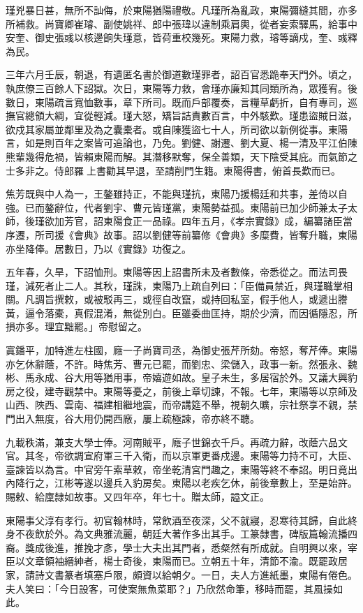 \begin{pinyinscope}
瑾兇暴日甚，無所不訕侮，於東陽猶陽禮敬。凡瑾所為亂政，東陽彌縫其間，亦多所補救。尚寶卿崔璿、副使姚祥、郎中張瑋以違制乘肩輿，從者妄索驛馬，給事中安奎、御史張彧以核邊餉失瑾意，皆荷重校幾死。東陽力救，璿等謫戍，奎、彧釋為民。

三年六月壬辰，朝退，有遺匿名書於御道數瑾罪者，詔百官悉跪奉天門外。頃之，執庶僚三百餘人下詔獄。次日，東陽等力救，會瑾亦廉知其同類所為，眾獲宥。後數日，東陽疏言寬恤數事，章下所司。既而戶部覆奏，言糧草虧折，自有專司，巡撫官總領大綱，宜從輕減。瑾大怒，矯旨詰責數百言，中外駭歎。瑾患盜賊日滋，欲戍其家屬並鄰里及為之囊橐者。或自陳獲盜七十人，所司欲以新例從事。東陽言，如是則百年之案皆可追論也，乃免。劉健、謝遷、劉大夏、楊一清及平江伯陳熊輩幾得危禍，皆賴東陽而解。其潛移默奪，保全善類，天下陰受其庇。而氣節之士多非之。侍郎羅上書勸其早退，至請削門生籍。東陽得書，俯首長歎而已。

焦芳既與中人為一，王鏊雖持正，不能與瑾抗，東陽乃援楊廷和共事，差倚以自強。已而鏊辭位，代者劉宇、曹元皆瑾黨，東陽勢益孤。東陽前已加少師兼太子太師，後瑾欲加芳官，詔東陽食正一品祿。四年五月，《孝宗實錄》成，編纂諸臣當序遷，所司援《會典》故事。詔以劉健等前纂修《會典》多糜費，皆奪升職，東陽亦坐降俸。居數日，乃以《實錄》功復之。

五年春，久旱，下詔恤刑。東陽等因上詔書所未及者數條，帝悉從之。而法司畏瑾，減死者止二人。其秋，瑾誅，東陽乃上疏自列曰：「臣備員禁近，與瑾職掌相關。凡調旨撰敕，或被駁再三，或徑自改竄，或持回私室，假手他人，或遞出謄黃，逼令落橐，真假混淆，無從別白。臣雖委曲匡持，期於少濟，而因循隱忍，所損亦多。理宜黜罷。」帝慰留之。

寘鐇平，加特進左柱國，廕一子尚寶司丞，為御史張芹所劾。帝怒，奪芹俸。東陽亦乞休辭蔭，不許。時焦芳、曹元已罷，而劉忠、梁儲入，政事一新。然張永、魏彬、馬永成、谷大用等猶用事，帝嬉遊如故。皇子未生，多居宿於外。又議大興豹房之役，建寺觀禁中。東陽等憂之，前後上章切諫，不報。七年，東陽等以京師及山西、陜西、雲南、福建相繼地震，而帝講筵不舉，視朝久曠，宗社祭享不親，禁門出入無度，谷大用仍開西廠，屢上疏極諫，帝亦終不聽。

九載秩滿，兼支大學士俸。河南賊平，廕子世錦衣千戶。再疏力辭，改蔭六品文官。其冬，帝欲調宣府軍三千入衛，而以京軍更番戍邊。東陽等力持不可，大臣、臺諫皆以為言。中官旁午索草敕，帝坐乾清宮門趣之，東陽等終不奉詔。明日竟出內降行之，江彬等遂以邊兵入豹房矣。東陽以老疾乞休，前後章數上，至是始許。賜敕、給廩隸如故事。又四年卒，年七十。贈太師，謚文正。

東陽事父淳有孝行。初官翰林時，常飲酒至夜深，父不就寢，忍寒待其歸，自此終身不夜飲於外。為文典雅流麗，朝廷大著作多出其手。工篆隸書，碑版篇翰流播四裔。獎成後進，推挽才彥，學士大夫出其門者，悉粲然有所成就。自明興以來，宰臣以文章領袖縉紳者，楊士奇後，東陽而已。立朝五十年，清節不渝。既罷政居家，請詩文書篆者填塞戶限，頗資以給朝夕。一日，夫人方進紙墨，東陽有倦色。夫人笑曰：「今日設客，可使案無魚菜耶？」乃欣然命筆，移時而罷，其風操如此。


\end{pinyinscope}
